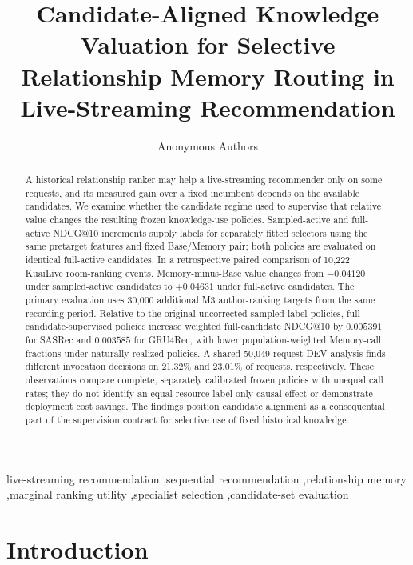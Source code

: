 \documentclass[preprint,12pt]{elsarticle}
\begin{document}
\begin{frontmatter}

\title{Candidate-Aligned Knowledge Valuation for Selective Relationship Memory Routing in Live-Streaming Recommendation}

\author{Anonymous Authors}

\begin{abstract}
A historical relationship ranker may help a live-streaming recommender only on some requests, and its measured gain over a fixed incumbent depends on the available candidates. We examine whether the candidate regime used to supervise that relative value changes the resulting frozen knowledge-use policies. Sampled-active and full-active NDCG@10 increments supply labels for separately fitted selectors using the same pretarget features and fixed Base/Memory pair; both policies are evaluated on identical full-active candidates. In a retrospective paired comparison of 10,222 KuaiLive room-ranking events, Memory-minus-Base value changes from $-0.04120$ under sampled-active candidates to $+0.04631$ under full-active candidates. The primary evaluation uses 30,000 additional M3 author-ranking targets from the same recording period. Relative to the original uncorrected sampled-label policies, full-candidate-supervised policies increase weighted full-candidate NDCG@10 by $0.005391$ for SASRec and $0.003585$ for GRU4Rec, with lower population-weighted Memory-call fractions under naturally realized policies. A shared 50,049-request DEV analysis finds different invocation decisions on 21.32\% and 23.01\% of requests, respectively. These observations compare complete, separately calibrated frozen policies with unequal call rates; they do not identify an equal-resource label-only causal effect or demonstrate deployment cost savings. The findings position candidate alignment as a consequential part of the supervision contract for selective use of fixed historical knowledge.
\end{abstract}

\begin{keyword}
live-streaming recommendation \sep sequential recommendation \sep relationship memory \sep marginal ranking utility \sep specialist selection \sep candidate-set evaluation
\end{keyword}

\end{frontmatter}

\section{Introduction}
\end{document}
